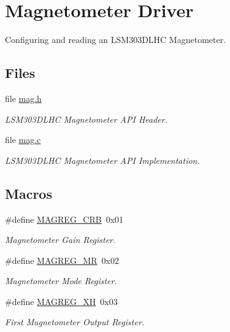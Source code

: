 \hypertarget{group__mag}{\section{Magnetometer Driver}
\label{group__mag}
}


Configuring and reading an L\-S\-M303\-D\-L\-H\-C Magnetometer.  


\subsection*{Files}
\begin{DoxyCompactItemize}
\item 
file \hyperlink{mag_8h}{mag.\-h}
\begin{DoxyCompactList}\small\item\em L\-S\-M303\-D\-L\-H\-C Magnetometer A\-P\-I Header. \end{DoxyCompactList}\item 
file \hyperlink{mag_8c}{mag.\-c}
\begin{DoxyCompactList}\small\item\em L\-S\-M303\-D\-L\-H\-C Magnetometer A\-P\-I Implementation. \end{DoxyCompactList}\end{DoxyCompactItemize}
\subsection*{Macros}
\begin{DoxyCompactItemize}
\item 
\#define \hyperlink{group__mag_ga42f59dd3e4a9cb4d8d4dd4a1019b6ab5}{M\-A\-G\-R\-E\-G\-\_\-\-C\-R\-B}~0x01
\begin{DoxyCompactList}\small\item\em Magnetometer Gain Register. \end{DoxyCompactList}\item 
\#define \hyperlink{group__mag_ga54eabf3b296f6550c9f6d9826020c623}{M\-A\-G\-R\-E\-G\-\_\-\-M\-R}~0x02
\begin{DoxyCompactList}\small\item\em Magnetometer Mode Register. \end{DoxyCompactList}\item 
\#define \hyperlink{group__mag_ga84e94fce89f9ba26ff3f33621c3a63bd}{M\-A\-G\-R\-E\-G\-\_\-\-X\-H}~0x03
\begin{DoxyCompactList}\small\item\em First Magnetometer Output Register. \end{DoxyCompactList}\end{DoxyCompactItemize}
